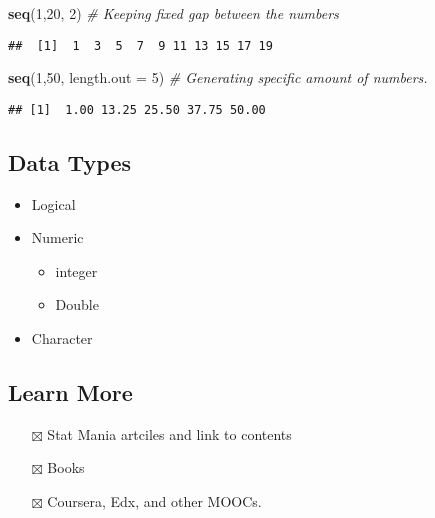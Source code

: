 \documentclass[
]{book}
\newenvironment{Shaded}{\begin{snugshade}}{\end{snugshade}}
\newcommand{\CommentTok}[1]{\textcolor[rgb]{0.56,0.35,0.01}{\textit{#1}}}
\newcommand{\DataTypeTok}[1]{\textcolor[rgb]{0.13,0.29,0.53}{#1}}
\newcommand{\DecValTok}[1]{\textcolor[rgb]{0.00,0.00,0.81}{#1}}
\newcommand{\KeywordTok}[1]{\textcolor[rgb]{0.13,0.29,0.53}{\textbf{#1}}}
\newcommand{\NormalTok}[1]{#1}
\providecommand{\tightlist}{%
  \setlength{\itemsep}{0pt}\setlength{\parskip}{0pt}}
\begin{document}
\begin{Shaded}
\begin{Highlighting}[]
\KeywordTok{seq}\NormalTok{(}\DecValTok{1}\NormalTok{,}\DecValTok{20}\NormalTok{, }\DecValTok{2}\NormalTok{) }\CommentTok{# Keeping fixed gap between the numbers}
\end{Highlighting}
\end{Shaded}

\begin{verbatim}
##  [1]  1  3  5  7  9 11 13 15 17 19
\end{verbatim}

\begin{Shaded}
\begin{Highlighting}[]
\KeywordTok{seq}\NormalTok{(}\DecValTok{1}\NormalTok{,}\DecValTok{50}\NormalTok{, }\DataTypeTok{length.out =} \DecValTok{5}\NormalTok{) }\CommentTok{# Generating specific amount of numbers.}
\end{Highlighting}
\end{Shaded}

\begin{verbatim}
## [1]  1.00 13.25 25.50 37.75 50.00
\end{verbatim}

\hypertarget{data-types}{%
\subsection{Data Types}\label{data-types}}

\begin{itemize}
\tightlist
\item
  Logical
\item
  Numeric

  \begin{itemize}
  \tightlist
  \item
    integer
  \item
    Double
  \end{itemize}
\item
  Character
\end{itemize}

\hypertarget{learn-more}{%
\subsection{Learn More}\label{learn-more}}

\begin{itemize}
\tightlist
\item[$\boxtimes$]
  Stat Mania artciles and link to contents
\item[$\boxtimes$]
  Books
\item[$\boxtimes$]
  Coursera, Edx, and other MOOCs.
\end{itemize}
\end{document}
